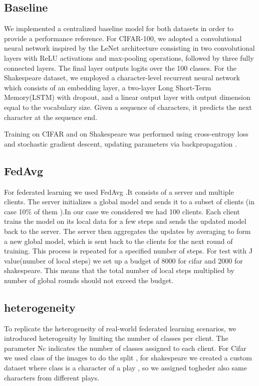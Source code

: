 \documentclass[10pt,twocolumn,letterpaper]{article}
\begin{document}
\subsection{Baseline}
We implemented a centralized baseline model for both datasets in order to provide a performance
 reference. 
For CIFAR-100, we adopted a convolutional neural network inspired by the LeNet architecture consisting in two convolutional layers with ReLU activations and max-pooling operations,
 followed by three fully connected layers. The final layer outputs logits over the 100 classes.
For the Shakespeare dataset, we employed a character-level recurrent neural network which consists of an embedding layer, a two-layer Long Short-Term Memory(LSTM) with dropout, and a linear output layer with output dimension equal to the vocabulary size. Given a sequence of characters, it predicts the next character at the sequence end.

 Training on CIFAR  and on Shakespeare was performed using cross-entropy loss and stochastic gradient descent,
updating parameters via backpropagation .




\subsection{FedAvg}
For federated learning we used FedAvg \cite{Paper10} .It consists of a server and multiple clients. The server initializes a global model and sends it to a subset of clients (in case 10\% of them ).In our case we considered we had 100 clients. Each client trains the model on its local data for a few steps and sends the updated model back to the server.
The server then aggregates the updates by averaging to form a new global model, which is sent back to the clients for the next round of training. This process is repeated for a specified number of steps.
For test with J value(number of local steps) we set up a budget of 8000 for cifar and 2000 for shakespeare. This means that the total number of local steps multiplied by number of  global rounds should not exceed the budget.

\subsection{heterogeneity}
To replicate the heterogeneity of real-world federated learning scenarios, we introduced heterogenity by limiting the number of classes per client.
The parameter Nc indicates the number of classes assigned to each client. For Cifar we used class of the images to do the split , for shakespeare we created a custom dataset where class is a character of a play , so we assigned togheder also same characters from different plays. 
\end{document}
